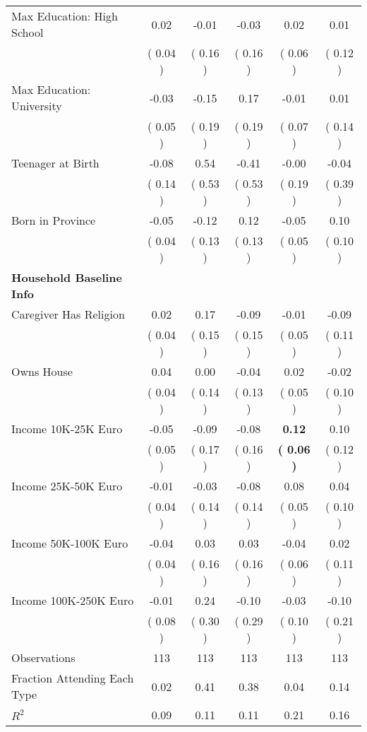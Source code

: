 \begin{table}[H]
{\begin{tabular}{lccccc}
\quad Max Education: High School &      0.02 &     -0.01 &     -0.03 &      0.02 &      0.01 \\
\quad  & (     0.04 ) & (     0.16 )  & (     0.16 )  & (     0.06 ) & (     0.12 ) \\
\quad Max Education: University &     -0.03 &     -0.15 &      0.17 &     -0.01 &      0.01 \\
\quad  & (     0.05 ) & (     0.19 )  & (     0.19 )  & (     0.07 ) & (     0.14 ) \\
\quad Teenager at Birth &     -0.08 &      0.54 &     -0.41 &     -0.00 &     -0.04 \\
\quad  & (     0.14 ) & (     0.53 )  & (     0.53 )  & (     0.19 ) & (     0.39 ) \\
\quad Born in Province &     -0.05 &     -0.12 &      0.12 &     -0.05 &      0.10 \\
\quad  & (     0.04 ) & (     0.13 )  & (     0.13 )  & (     0.05 ) & (     0.10 ) \\
\midrule
\textbf{Household Baseline Info} \\
\quad Caregiver Has Religion &      0.02 &      0.17 &     -0.09 &     -0.01 &     -0.09 \\
\quad  & (     0.04 ) & (     0.15 )  & (     0.15 )  & (     0.05 ) & (     0.11 ) \\
\quad Owns House &      0.04 &      0.00 &     -0.04 &      0.02 &     -0.02 \\
\quad  & (     0.04 ) & (     0.14 )  & (     0.13 )  & (     0.05 ) & (     0.10 ) \\
\quad Income 10K-25K Euro &     -0.05 &     -0.09 &     -0.08 & \textbf{     0.12} &      0.10 \\
\quad  & (     0.05 ) & (     0.17 )  & (     0.16 )  & \textbf{(     0.06 )} & (     0.12 ) \\
\quad Income 25K-50K Euro &     -0.01 &     -0.03 &     -0.08 &      0.08 &      0.04 \\
\quad  & (     0.04 ) & (     0.14 )  & (     0.14 )  & (     0.05 ) & (     0.10 ) \\
\quad Income 50K-100K Euro &     -0.04 &      0.03 &      0.03 &     -0.04 &      0.02 \\
\quad  & (     0.04 ) & (     0.16 )  & (     0.16 )  & (     0.06 ) & (     0.11 ) \\
\quad Income 100K-250K Euro &     -0.01 &      0.24 &     -0.10 &     -0.03 &     -0.10 \\
\quad  & (     0.08 ) & (     0.30 )  & (     0.29 )  & (     0.10 ) & (     0.21 ) \\
\midrule
Observations & 113 & 113 & 113 & 113 & 113 \\
Fraction Attending Each Type &      0.02 &      0.41 &      0.38 &      0.04 &      0.14 \\
\midrule
$ R^2$ &      0.09 &      0.11 &      0.11 &      0.21 &      0.16 \\
\bottomrule
\end{tabular}}
\end{table}
